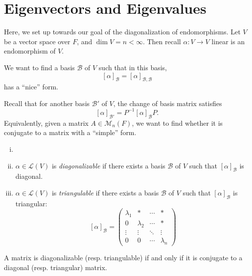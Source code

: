 \documentclass[12pt]{article}
\begin{document}
\newpage

\section{Eigenvectors and Eigenvalues}%
\label{sec:eigenvectors_and_eigenvalues}

Here, we set up towards our goal of the diagonalization of endomorphisms. Let $V$ be a vector space over $F$, and $\dim V = n < \infty$. Then recall $\alpha : V \to V$ linear is an endomorphism of $V$.

We want to find a basis $\mathcal{B}$ of $V$ such that in this basis,
\[
	[\alpha]_{\mathcal{B}} = [\alpha]_{\mathcal{B}, \mathcal{B}}
\]
has a ``nice'' form.

Recall that for another basis $\mathcal{B}'$ of $V$, the change of basis matrix satisfies
\[
	[\alpha]_{\mathcal{B}'} = P^{-1}[\alpha]_{\mathcal{B}}P
.\]
Equivalently, given a matrix $A \in \mathcal{M}_n(F)$, we want to find whether it is conjugate to a matrix with a ``simple'' form.

\begin{definition}
	\begin{enumerate}[(i)]
		\item[]
		\item $\alpha \in \mathcal{L}(V)$ is \textit{diagonalizable} if there exists a basis $\mathcal{B}$ of $V$ such that $[\alpha]_{\mathcal{B}}$ is diagonal.
		\item $\alpha \in \mathcal{L}(V)$ is \textit{triangulable} if there exists a basis $\mathcal{B}$ of $V$ such that $[\alpha]_{\mathcal{B}}$ is triangular:
			\[
				[\alpha]_{\mathcal{B}}=
				\begin{pmatrix}
					\lambda_1 & \ast & \cdots & \ast \\
					0 & \lambda_2 & \cdots & \ast \\
					\vdots & \vdots & \ddots & \vdots \\
					0 & 0 & \cdots & \lambda_n
				\end{pmatrix}
			\]
	\end{enumerate}
\end{definition}

\begin{remark}
	A matrix is diagonalizable (resp. triangulable) if and only if it is conjugate to a diagonal (resp. triangular) matrix.
\end{remark}
\end{document}
